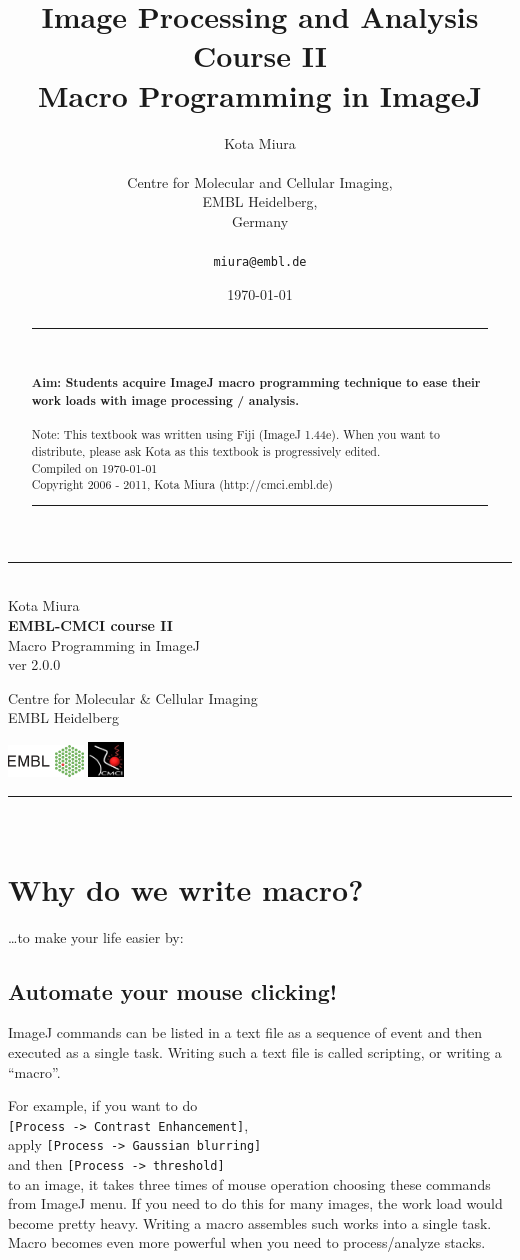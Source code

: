 \documentclass[11pt,a4paper,oneside]{report}
\newcommand{\ijmenu}[1]{\texttt{\small#1}}
\newcommand{\HRule}{\rule{\linewidth}{0.5mm}}
\newcommand*{\titleTH}{\begingroup%
\raggedleft
\HRule\\
\vspace*{\baselineskip}
{\Large Kota Miura}\\[0.167\textheight]

{\bfseries EMBL-CMCI course II}\\[\baselineskip]
{\textcolor{Medium}{\Huge Macro Programming in ImageJ}}\\[\baselineskip]
{\small ver 2.0.0}\par
\vfill

{\Large Centre for Molecular \& Cellular Imaging\\EMBL Heidelberg}\par
\includegraphics[width=0.15\textwidth]{fig/rgb_logo_2006_win.eps} 
\includegraphics[width=0.07\textwidth]{fig/Icon30pedge.jpg}\\[1cm] 
\vspace*{3\baselineskip}
\HRule\\
\endgroup}
\begin{document}
\title{Image Processing and Analysis Course II\\
Macro Programming in ImageJ}
\author{Kota Miura\\
\\
  Centre for Molecular and Cellular Imaging,\\
  EMBL Heidelberg,\\
  Germany\\
\\
\texttt{miura@embl.de}
}

\date{\today}

\pagestyle{empty}
\titleTH
\clearpage
\pagestyle{fancyplain}
\begin{abstract}
\HRule
\\
\\
\textbf{Aim: Students acquire ImageJ macro programming technique to ease their work loads with image processing / analysis.}
\\
\\
Note: This textbook was written using Fiji (ImageJ 1.44e). 
When you want to distribute, please ask Kota as this textbook is progressively edited.
\\
Compiled on \today \\
Copyright 2006 - 2011, Kota Miura (http://cmci.embl.de)
\\
\HRule
\end{abstract}

\begingroup
\hypersetup{linkcolor=black}
\tableofcontents
\endgroup

\clearpage
\setcounter{chapter}{2}
\section{Why do we write macro?}

\dots to make your life easier by:

\subsection{Automate your mouse clicking!}

ImageJ commands can be listed in a text file as a sequence of event and then executed as a single task. Writing such a text file is called scripting, or writing a ``macro''. 

For example, if you want to do \\
\ijmenu{[Process -> Contrast Enhancement]}, \\
apply \ijmenu{[Process -> Gaussian blurring]} \\
and then \ijmenu{[Process -> threshold]} \\
to an image, it takes three times of mouse operation choosing these commands from ImageJ menu. If you need to do this for many images, the work load would become pretty heavy. Writing a macro assembles such works into a single task. Macro becomes even more powerful when you need to process/analyze stacks. 
\end{document}
